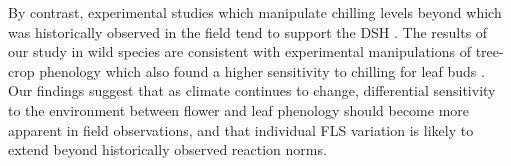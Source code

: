 \documentclass[11pt]{article}\usepackage[]{graphicx}\usepackage[]{color}
\begin{document}
{\noindent By contrast, experimental studies which manipulate chilling levels beyond which was historically observed in the field tend to support the DSH \citep[e.g.][]{Aslani2009,Gariglio2006}. The results of our study in wild species are consistent with experimental manipulations of tree-crop phenology which also found a higher sensitivity to chilling for leaf buds \citep{Gariglio2006,Citadin2001}. Our findings suggest that as climate continues to change, differential sensitivity to the environment between flower and leaf phenology should become more apparent in field observations, and that individual FLS variation is likely to extend beyond historically observed reaction norms.




 


}
\end{document}
